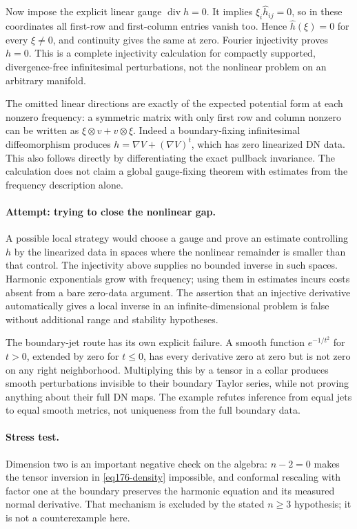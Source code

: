 \documentclass[11pt,a4paper]{article}
\numberwithin{equation}{section}
\begin{document}
Now impose the explicit linear gauge $\operatorname{div}h=0$.
It implies $\xi_i\widehat h_{ij}=0$, so in these coordinates all first-row
and first-column entries vanish too. Hence $\widehat h(\xi)=0$ for every
$\xi\ne0$, and continuity gives the same at zero. Fourier injectivity
proves $h=0$. This is a complete injectivity calculation for compactly
supported, divergence-free infinitesimal perturbations, not the nonlinear
problem on an arbitrary manifold.

The omitted linear directions are exactly of the expected potential form
at each nonzero frequency: a symmetric matrix with only first row and
column nonzero can be written as $\xi\otimes v+v\otimes\xi$.
Indeed a boundary-fixing infinitesimal diffeomorphism produces
$h=\nabla V+(\nabla V)^t$, which has zero linearized DN data. This also
follows directly by differentiating the exact pullback invariance. The
calculation does not claim a global gauge-fixing theorem with estimates
from the frequency description alone.

\paragraph{Attempt: trying to close the nonlinear gap.}
A possible local strategy would choose a gauge and prove an estimate
controlling $h$ by the linearized data in spaces where the nonlinear
remainder is smaller than that control. The injectivity above supplies no
bounded inverse in such spaces. Harmonic exponentials grow with frequency;
using them in estimates incurs costs absent from a bare zero-data argument.
The assertion that an injective derivative automatically gives a local
inverse in an infinite-dimensional problem is false without additional
range and stability hypotheses.

The boundary-jet route has its own explicit failure. A smooth function
$e^{-1/t^2}$ for $t>0$, extended by zero for $t\le0$, has every derivative
zero at zero but is not zero on any right neighborhood. Multiplying this
by a tensor in a collar produces smooth perturbations invisible to their
boundary Taylor series, while not proving anything about their full DN
maps. The example refutes inference from equal jets to equal smooth metrics,
not uniqueness from the full boundary data.

\paragraph{Stress test.}
Dimension two is an important negative check on the algebra:
$n-2=0$ makes the tensor inversion in \eqref{eq176-density} impossible,
and conformal rescaling with factor one at the boundary preserves the
harmonic equation and its measured normal derivative. That mechanism is
excluded by the stated $n\ge3$ hypothesis; it is not a counterexample here.
\end{document}

